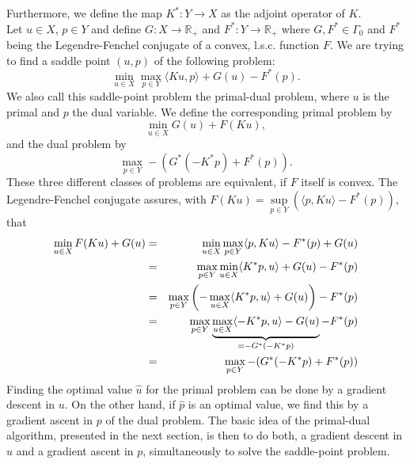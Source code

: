 \documentclass{scrreprt}
\begin{document}
        Furthermore, we define the map $K^{\ast}: Y \longrightarrow X$ as the adjoint operator of $K$.\\
        Let $u \in X$, $p \in Y$ and define $G: X \longrightarrow \mathbb{R}_{+}$ and $F^{\ast}: Y \longrightarrow \mathbb{R}_{+}$ where $G, F^{\ast} \in \Gamma_{0}$ and $F^{\ast}$ being the Legendre-Fenchel conjugate of a convex, l.s.c. function $F$. We are trying to find a saddle point $(u, p)$ of the following problem:
            \begin{equation}
                \min_{u \in X} \max_{p \in Y} \langle Ku, p \rangle + G(u) - F^{\ast}(p).
                \label{eq:the_saddle_point_problem}
            \end{equation}
        We also call this saddle-point problem the primal-dual problem, where $u$ is the primal and $p$ the dual variable. We define the corresponding primal problem by
            \begin{equation}
                \min_{u \in X} G(u) + F(Ku),
                \label{eq:primal_problem}
            \end{equation}
        and the dual problem by
            \begin{equation}
                \max_{p \in Y} -(G^{\ast}(-K^{\ast}p) + F^{\ast}(p)).
                \label{eq:dual_problem}
            \end{equation}
        These three different classes of problems are equivalent, if $F$ itself is convex. The Legendre-Fenchel conjugate assures, with $F(Ku) = \sup\limits_{p \in Y} \left( \langle p, Ku \rangle - F^{\ast}(p) \right)$, that
            \begin{eqnarray}
                \min_{u \in X} F(Ku) + G(u) &=& \min_{u \in X} \max_{p \in Y} \langle p, Ku \rangle - F^{\ast}(p) + G(u) \notag \\
                &=& \max_{p \in Y} \min_{u \in X} \langle K^{\ast}p, u \rangle + G(u) - F^{\ast}(p) \notag \\
                &=& \max_{p \in Y} \left( -\max_{u \in X} \langle K^{\ast}p, u \rangle + G(u) \right) - F^{\ast}(p) \notag \\
                &=& \max_{p \in Y} \underbrace{\max_{u \in X} \langle -K^{\ast}p, u \rangle - G(u)}_{= -G^{\ast}(-K^{\ast}p)} - F^{\ast}(p) \notag \\
                &=& \max_{p \in Y} -(G^{\ast}(-K^{\ast}p) + F^{\ast}(p)) \notag
            \end{eqnarray}
        Finding the optimal value $\hat{u}$ for the primal problem can be done by a gradient descent in $u$. On the other hand, if $\hat{p}$ is an optimal value, we find this by a gradient ascent in $p$ of the dual problem. The basic idea of the primal-dual algorithm, presented in the next section, is then to do both, a gradient descent in $u$ and a gradient ascent in $p$, simultaneously to solve the saddle-point problem.
\end{document}
